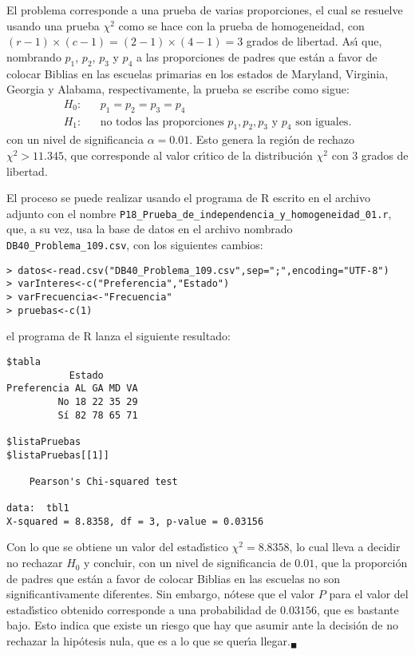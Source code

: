 \begin{solucion}
 El problema corresponde a una prueba de varias proporciones,
 el cual se resuelve usando una prueba $\chi^2$ como se hace con la prueba
 de homogeneidad, con $(r-1)\times(c-1) = (2-1)\times (4-1) = 3$ grados
 de libertad. As\'{\i} que, nombrando $p_1$, $p_2$, $p_3$ y $p_4$
 a las proporciones de padres que est\'an a favor de colocar Biblias
 en las escuelas primarias en los estados de Maryland, Virginia, Georgia
 y Alabama, respectivamente, la prueba se escribe como sigue:
 \begin{eqnarray*}
  H_0: & & p_1 = p_2 = p_3 = p_4 \\
  H_1: & & \text{no todos las proporciones } p_1, p_2, p_3 \text{ y } p_4
  \text{ son iguales.}
 \end{eqnarray*}
 con un nivel de significancia $\alpha = 0.01$.
 Esto genera la regi\'on de rechazo $\chi^2 > 11.345$, 
 que corresponde al valor cr\'{\i}tico de la distribuci\'on $\chi^2$
 con $3$ grados de libertad.
 \par 
 El proceso se puede realizar usando el programa de R escrito
 en el archivo adjunto con el nombre
 \texttt{P18\_Prueba\_de\_independencia\_y\_homogeneidad\_01.r},
 que, a su vez, usa la base de datos en el archivo nombrado
 \texttt{DB40\_Problema\_109.csv}, con los siguientes cambios:
 \begin{verbatim}
> datos<-read.csv("DB40_Problema_109.csv",sep=";",encoding="UTF-8")
> varInteres<-c("Preferencia","Estado")
> varFrecuencia<-"Frecuencia"
> pruebas<-c(1)
 \end{verbatim}
 \vspace{-0.5cm}
 el programa de R lanza el siguiente resultado:
 \begin{verbatim}
$tabla
           Estado
Preferencia AL GA MD VA
         No 18 22 35 29
         Sí 82 78 65 71

$listaPruebas
$listaPruebas[[1]]

	Pearson's Chi-squared test

data:  tbl1
X-squared = 8.8358, df = 3, p-value = 0.03156
 \end{verbatim}
 \vspace{-0.5cm}
 Con lo que se obtiene un valor del estad\'{\i}stico $\chi^2 = 8.8358$,
 lo cual lleva a decidir no rechazar $H_0$ y concluir,
 con un nivel de significancia de $0.01$, 
 que la proporci\'on de padres que est\'an a favor de colocar Biblias
 en las escuelas no son significantivamente diferentes.
 Sin embargo, n\'otese que el valor $P$ para el valor del estad\'{\i}stico
 obtenido corresponde a una probabilidad de $0.03156$,
 que es bastante bajo.
 Esto indica que existe un riesgo que hay que asumir
 ante la decisi\'on de no rechazar la hip\'otesis nula,
 que es a lo que se quer\'{\i}a llegar.${}_{\blacksquare}$
\end{solucion}
